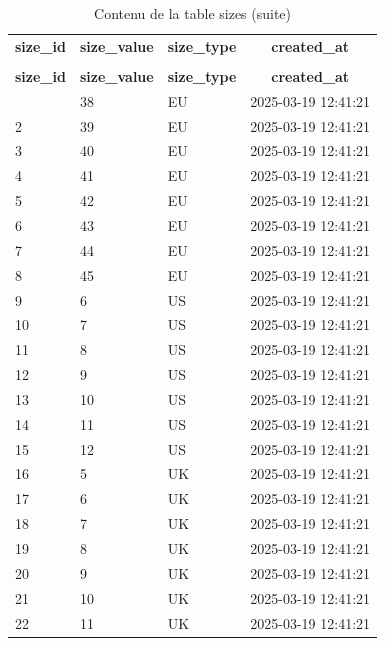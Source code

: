 %
%
 \begin{longtable}{|l|l|l|l|} 
 \hline \endhead \hline \endfoot \hline 
 \caption{Contenu de la table sizes} \label{tab:sizes-data} \\\hline \multicolumn{1}{|c|}{\textbf{size\_id}} & \multicolumn{1}{|c|}{\textbf{size\_value}} & \multicolumn{1}{|c|}{\textbf{size\_type}} & \multicolumn{1}{|c|}{\textbf{created\_at}} \\ \hline \hline  \endfirsthead 
\caption{Contenu de la table sizes (suite)} \\ \hline \multicolumn{1}{|c|}{\textbf{size\_id}} & \multicolumn{1}{|c|}{\textbf{size\_value}} & \multicolumn{1}{|c|}{\textbf{size\_type}} & \multicolumn{1}{|c|}{\textbf{created\_at}} \\ \hline \hline \endhead \endfoot
1 & 38 & EU & 2025-03-19 12:41:21 \\ \hline 
2 & 39 & EU & 2025-03-19 12:41:21 \\ \hline 
3 & 40 & EU & 2025-03-19 12:41:21 \\ \hline 
4 & 41 & EU & 2025-03-19 12:41:21 \\ \hline 
5 & 42 & EU & 2025-03-19 12:41:21 \\ \hline 
6 & 43 & EU & 2025-03-19 12:41:21 \\ \hline 
7 & 44 & EU & 2025-03-19 12:41:21 \\ \hline 
8 & 45 & EU & 2025-03-19 12:41:21 \\ \hline 
9 & 6 & US & 2025-03-19 12:41:21 \\ \hline 
10 & 7 & US & 2025-03-19 12:41:21 \\ \hline 
11 & 8 & US & 2025-03-19 12:41:21 \\ \hline 
12 & 9 & US & 2025-03-19 12:41:21 \\ \hline 
13 & 10 & US & 2025-03-19 12:41:21 \\ \hline 
14 & 11 & US & 2025-03-19 12:41:21 \\ \hline 
15 & 12 & US & 2025-03-19 12:41:21 \\ \hline 
16 & 5 & UK & 2025-03-19 12:41:21 \\ \hline 
17 & 6 & UK & 2025-03-19 12:41:21 \\ \hline 
18 & 7 & UK & 2025-03-19 12:41:21 \\ \hline 
19 & 8 & UK & 2025-03-19 12:41:21 \\ \hline 
20 & 9 & UK & 2025-03-19 12:41:21 \\ \hline 
21 & 10 & UK & 2025-03-19 12:41:21 \\ \hline 
22 & 11 & UK & 2025-03-19 12:41:21 \\ \hline 
 \end{longtable}

